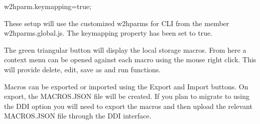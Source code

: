\documentclass[letterpaper,10pt,english]{sphinxmanual}
\begin{document}
\begin{sphinxVerbatim}[commandchars=\\\{\}]
   
\end{sphinxVerbatim}

\sphinxAtStartPar
{}
\begin{description}
\sphinxlineitem{::}
\sphinxAtStartPar
w2hparm.keymapping=true;

\end{description}

\sphinxAtStartPar
{}

\sphinxAtStartPar
These setup will use the customized w2hparms for CLI from the member w2hparms.global.js. The keymapping property has been set to true.

\ignorespaces 
\sphinxAtStartPar
{}

\sphinxAtStartPar
The green triangular button will display the local storage macros. From here a context menu can be opened against each macro using the mouse right click. This will provide delete, edit, save as and run functions.

\sphinxAtStartPar
{}

\sphinxAtStartPar
{}

\ignorespaces 
\sphinxAtStartPar
{}

\sphinxAtStartPar
Macros can be exported or imported using the Export and Import buttons. On export, the MACROS.JSON file will be created. If you plan to migrate to using the DDI option you will need to export the macros and then upload the relevant MACROS.JSON file through the DDI interface.
\end{document}
